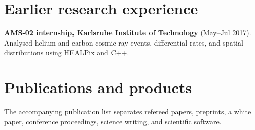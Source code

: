 \documentclass[11pt]{article}
\begin{document}
\section*{Earlier research experience}
\textbf{AMS-02 internship, Karlsruhe Institute of Technology} (May--Jul 2017). Analysed helium and carbon cosmic-ray events, differential rates, and spatial distributions using HEALPix and C++.
\section*{Publications and products}
The accompanying publication list separates refereed papers, preprints, a white paper, conference proceedings, science writing, and scientific software.
\end{document}
